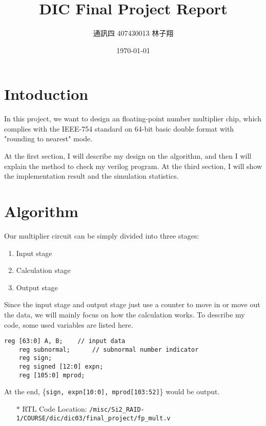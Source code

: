 \documentclass{article}
\title{DIC Final Project Report}
\author{通訊四 407430013 林子翔}
\date{\today}
\begin{document}
    \begin{titlepage}
        \begin{CJK}{UTF8}{bsmi}
        \maketitle
        \end{CJK}
        \thispagestyle{empty}
    \end{titlepage}
    
    \section*{Intoduction}
        In this project, we want to design an floating-point number multiplier chip, 
        which complies with the IEEE-754 standard on 64-bit basic double format with "rounding to nearest" mode. 

        At the first section, I will describe my design on the algorithm, 
        and then I will explain the method to check my verilog program. 
        At the third section, I will show the implementation result and the simulation statistics.


    \section{Algorithm}
        Our multiplier circuit can be simply divided into three stages:
        \begin{enumerate}
            \item Input stage
            \item Calculation stage
            \item Output stage
        \end{enumerate}
        Since the input stage and output stage just use a counter to move in or move out the data, we will mainly focus on how the calculation works.
        \newline\newline
        To describe my code, some used variables are listed here.
        \begin{lstlisting}[style=verilog-style]
    reg [63:0] A, B;    // input data
    reg subnormal;      // subnormal number indicator
    reg sign;
    reg signed [12:0] expn;
    reg [105:0] mprod;
        \end{lstlisting}
        At the end, \{{\tt sign, expn[10:0], mprod[103:52]}\} would be output.

        \begin{itemize}
            \item[$*$] RTL Code Location: \verb|/misc/Si2_RAID-1/COURSE/dic/dic03/final_project/fp_mult.v|
        \end{itemize}
\end{document}
